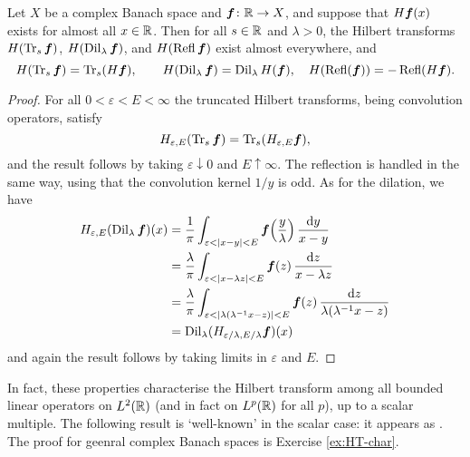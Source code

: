 \begin{prop}
  Let $X$ be a complex Banach space and $\bm{f} \colon \mathbb{R} \rightarrow X$, and suppose that $H\bm{f}(x)$ exists for almost all $x \in \mathbb{R}$.
  Then for all $s \in \mathbb{R}$ and $\lambda > 0$, the Hilbert transforms $H(\operatorname{Tr}_{s} \bm{f})$, $H(\operatorname{Dil}_{\lambda} \bm{f})$, and $H(\operatorname{Refl} \bm{f})$  exist almost everywhere, and
  \begin{equation*}
    H(\operatorname{Tr}_{s} \bm{f}) = \operatorname{Tr}_{s} (H\bm{f}), \qquad H(\operatorname{Dil}_{\lambda} \bm{f}) = \operatorname{Dil}_{\lambda} H(\bm{f}), \quad H(\operatorname{Refl}(\bm{f})) = -\operatorname{Refl}(H\bm{f}).
  \end{equation*}
\end{prop}

\begin{proof}
  For all $0 < \varepsilon < E < \infty$ the truncated Hilbert transforms, being convolution operators, satisfy
  \begin{equation*}
    H_{\varepsilon,E}(\operatorname{Tr}_{s} \bm{f}) = \operatorname{Tr}_{s} (H_{\varepsilon,E} \bm{f}),
  \end{equation*}
  and the result follows by taking $\varepsilon \downarrow 0$ and $E \uparrow \infty$.
  The reflection is handled in the same way, using that the convolution kernel $1/y$ is odd.
  As for the dilation, we have
  \begin{equation*}
    \begin{aligned}
      H_{\varepsilon,E}(\operatorname{Dil}_{\lambda} \bm{f})(x)
      &= \frac{1}{\pi} \int_{\varepsilon < |x-y| < E} \bm{f}\Big(\frac{y}{\lambda}\Big) \, \frac{\mathrm{d} y}{x-y} \\
      &= \frac{\lambda}{\pi} \int_{\varepsilon < |x - \lambda z| < E} \bm{f}(z) \, \frac{\mathrm{d} z}{x - \lambda z} \\
      &= \frac{\lambda}{\pi} \int_{\varepsilon < |\lambda(\lambda^{-1}x - z)| < E} \bm{f}(z) \, \frac{\mathrm{d} z}{\lambda(\lambda^{-1}x - z)} \\
      &= \operatorname{Dil}_{\lambda}(H_{\varepsilon/\lambda, E/\lambda} \bm{f})(x)
    \end{aligned}
  \end{equation*}
  and again the result follows by taking limits in $\varepsilon$ and $E$.
\end{proof}

In fact, these properties characterise the Hilbert transform among all bounded linear operators on $L^2(\mathbb{R})$ (and in fact on $L^p(\mathbb{R})$ for all $p$), up to a scalar multiple.
The following result is `well-known' in the scalar case: it appears as \cite[Exercise 5.1.11]{grafakos}.
The proof for geenral complex Banach spaces is Exercise \ref{ex:HT-char}.%

